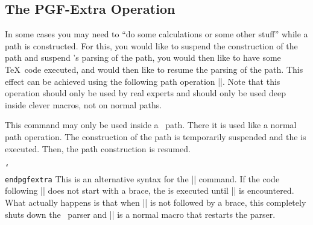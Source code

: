 \subsection{The PGF-Extra Operation}

In some cases you may need to ``do some calculations or some other stuff''
while a path is constructed. For this, you would like to suspend the
construction of the path and suspend \tikzname's parsing of the path, you would
then like to have some \TeX\ code executed, and would then like to resume the
parsing of the path. This effect can be achieved using the following path
operation |\pgfextra|. Note that this operation should only be used by real
experts and should only be used deep inside clever macros, not on normal paths.

\begin{command}{\pgfextra{}}
    This command may only be used inside a \tikzname\ path. There it is used
    like a normal path operation. The construction of the path is temporarily
    suspended and the  is executed. Then, the path construction is
    resumed.
\begin{codeexample}[]
\newdimen\mydim
\begin{tikzpicture}
  \mydim=1cm
  \draw (0pt,\mydim) \pgfextra{\mydim=2cm} -- (0pt,\mydim);
\end{tikzpicture}
\end{codeexample}
\end{command}

\begin{command}{\pgfextra {} \texttt{\char`\\endpgfextra}}
    This is an alternative syntax for the |\pgfextra| command. If the code
    following |\pgfextra| does not start with a brace, the  is
    executed until |\endpgfextra| is encountered. What actually happens is that
    when |\pgfextra| is not followed by a brace, this completely shuts down the
    \tikzname\ parser and |\endpgfextra| is a normal macro that restarts the
    parser.
\begin{codeexample}[]
\newdimen\mydim
\begin{tikzpicture}
  \mydim=1cm
  \draw (0pt,\mydim)
    \pgfextra \mydim=2cm \endpgfextra -- (0pt,\mydim);
\end{tikzpicture}
\end{codeexample}
\end{command}
